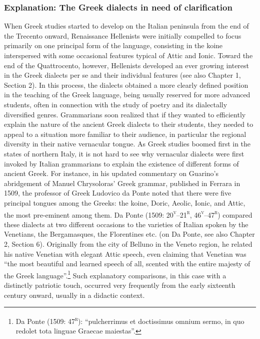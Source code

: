 \subsubsection{Explanation: The Greek dialects in need of clarification}
\hypertarget{Toc19704859}{}\begin{styleStandard}
When Greek studies started to develop on the Italian peninsula from the end of the Trecento onward, Renaissance Hellenists were initially compelled to focus primarily on one principal form of the language, consisting in the koine interspersed with some occasional features typical of Attic and Ionic. Toward the end of the Quattrocento, however, Hellenists developed an ever growing interest in the Greek dialects per se and their individual features (see also Chapter 1, Section 2). In this process, the dialects obtained a more clearly defined position in the teaching of the Greek language, being usually reserved for more advanced students, often in connection with the study of poetry and its dialectally diversified genres. Grammarians soon realized that if they wanted to efficiently explain the nature of the ancient Greek dialects to their students, they needed to appeal to a situation more familiar to their audience, in particular the regional diversity in their native vernacular tongue. As Greek studies boomed first in the states of northern Italy, it is not hard to see why vernacular dialects were first invoked by Italian grammarians to explain the existence of different forms of ancient Greek. For instance, in his updated commentary on Guarino’s abridgement of Manuel Chrysoloras’ Greek grammar, published in Ferrara in 1509, the professor of Greek Ludovico da Ponte noted that there were five principal tongues among the Greeks: the koine, Doric, Aeolic, Ionic, and Attic, the most pre-eminent among them. Da Ponte (1509: 20\textsc{\textsuperscript{v}}–21\textsc{\textsuperscript{r}}, 46\textsc{\textsuperscript{v}}–47\textsc{\textsuperscript{r}}) compared these dialects at two different occasions to the varieties of Italian spoken by the Venetians, the Bergamasques, the Florentines etc. (on Da Ponte, see also Chapter 2, Section 6). Originally from the city of Belluno in the Veneto region, he related his native Venetian with elegant Attic speech, even claiming that Venetian was “the most beautiful and learned speech of all, scented with the entire majesty of the Greek language”.\footnote{ Da Ponte (1509: 47\textsc{\textsuperscript{r}}): “pulcherrimus et doctissimus omnium sermo, in quo redolet tota linguae Graecae maiestas”.} Such explanatory comparisons, in this case with a distinctly patriotic touch, occurred very frequently from the early sixteenth century onward, usually in a didactic context.
\end{styleStandard}

